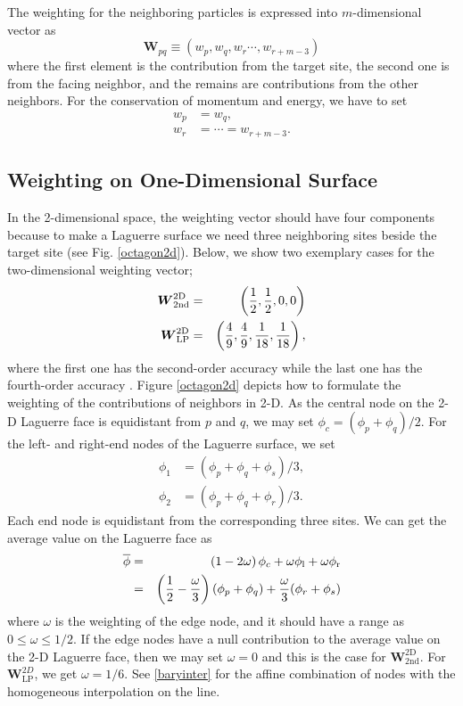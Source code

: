 \documentclass[twocolumn]{aastex63}
\begin{document}
The weighting for the neighboring particles is expressed into $m$-dimensional vector as
\begin{equation}
	\boldsymbol{W}_{pq} \equiv (w_p, w_q, w_{r}\cdots, w_{r+m-3})
\end{equation}
where the first element is the contribution from the target site, the second one is from the facing neighbor, and the remains are contributions from the other neighbors.
For the conservation of momentum and energy, we have to set
\begin{equation*}
\begin{aligned}
  w_p &= w_q,\\
  w_r &= \cdots = w_{r+m-3}.
\end{aligned}
\end{equation*}


\subsection{Weighting on One-Dimensional Surface}
In the 2-dimensional space, the weighting vector should have four components because to make a Laguerre surface we need three neighboring sites beside the target site (see Fig. \ref{octagon2d}). Below, we show two exemplary cases for the two-dimensional weighting vector; 
\begin{eqnarray}
	\boldsymbol{W}^\text{2D}_\text{2nd} &=& \left({1\over2},{1\over2},0,0\right) \\
	\boldsymbol{W}^\text{2D}_\text{LP} &=& \left({4\over9},{4\over9},{1\over 18}, {1\over 18}\right), 
\end{eqnarray}
where the first one has the second-order accuracy while the last one has the fourth-order accuracy \citep{LILEK1995239}. Figure \ref{octagon2d} depicts how to formulate the weighting of the contributions of neighbors in 2-D. As the central node on the 2-D Laguerre face is equidistant from $p$ and $q$, we may set $\phi_c = (\phi_p +\phi_q)/2$. For the left- and right-end nodes of the Laguerre surface, we set
\begin{equation*}
\begin{aligned}
  \phi_1 &= (\phi_p+\phi_q+\phi_s)/3,\\
  \phi_2 &= (\phi_p+\phi_q+\phi_r)/3.
\end{aligned}
\end{equation*}
Each end node is equidistant from the corresponding three sites.
We can get the average value on the Laguerre face as
\begin{eqnarray}
	\overline{\phi} &=& \left(1-{2}\omega\right)\phi_c + {\omega}\phi_\text{l} + {\omega}\phi_\text{r}\\
	&=&  \left({1\over2}-{\omega\over3}\right)(\phi_p+\phi_q) + {\omega\over3}(\phi_r+\phi_s) 
\end{eqnarray}
where  $\omega$ is the weighting of the edge node, and it should have a range as $0\le \omega\le 1/2$. If the edge nodes have a null contribution to the average value on the 2-D Laguerre face, then we may set $\omega=0$ and this is the case for $\boldsymbol{W}_\text{2nd}^\text{2D}$. For $\boldsymbol{W}_\text{LP}^{2D}$, we get $\omega=1/6$.  See \ref{baryinter} for the affine combination of nodes with the homogeneous interpolation on the line.
\end{document}
